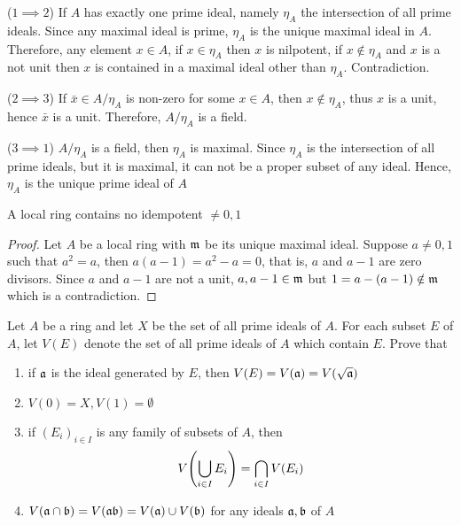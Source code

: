 \begin{longproof}
	($1 \implies 2$) If $A$ has exactly one prime ideal, namely $\eta_A$ the intersection of all prime ideals. Since any maximal ideal is prime, $\eta_A$ is the unique maximal ideal in $A$. Therefore, any element $x \in A$, if $x \in \eta_A$ then $x$ is nilpotent, if $x \notin \eta_A$ and $x$ is a not unit then $x$ is contained in a maximal ideal other than $\eta_A$. Contradiction.
	
	($2 \implies 3$) If $\bar{x} \in A / \eta_A$ is non-zero for some $x \in A$, then $x \notin \eta_A$, thus $x$ is a unit, hence $\bar{x}$ is a unit. Therefore, $A / \eta_A$ is a field.
	
	($3 \implies 1$)  $A / \eta_A$ is a field, then $\eta_A$ is maximal. Since $\eta_A$ is the intersection of all prime ideals, but it is maximal, it can not be a proper subset of any ideal. Hence, $\eta_A$ is the unique prime ideal of $A$
\end{longproof}

\begin{problem}
	A local ring contains no idempotent $\neq 0, 1$
\end{problem}

\begin{proof}
	Let $A$ be a local ring with $\mathfrak{m}$ be its unique maximal ideal. Suppose $a \neq 0, 1$ such that $a^2 = a$, then $a(a-1) = a^2 - a = 0$, that is, $a$ and $a-1$ are zero divisors. Since $a$ and $a-1$ are not a unit, $a, a-1 \in \mathfrak{m}$ but $1 = a - (a - 1) \notin \mathfrak{m}$ which is a contradiction.
\end{proof}

\begin{problem}
	Let $A$ be a ring and let $X$ be the set of all prime ideals of $A$. For each subset $E$ of $A$, let $V(E)$ denote the set of all prime ideals of $A$ which contain $E$. Prove that
	\begin{enumerate}
		\item if $\mathfrak{a}$ is the ideal generated by $E$, then $V(E) = V(\mathfrak{a}) = V(\sqrt{\mathfrak{a}})$
		
		\item $V(0) = X, V(1) = \emptyset$
		
		\item if $(E_i)_{i \in I}$ is any family of subsets of $A$, then 
		$$
			V\tuple*{\bigcup_{i \in I} E_i} = \bigcap_{i \in I} V(E_i)
		$$
		
		\item $V(\mathfrak{a} \cap \mathfrak{b}) = V(\mathfrak{ab}) = V(\mathfrak{a}) \cup V(\mathfrak{b})$ for any ideals $\mathfrak{a}, \mathfrak{b}$ of $A$
	\end{enumerate}
\end{problem}

